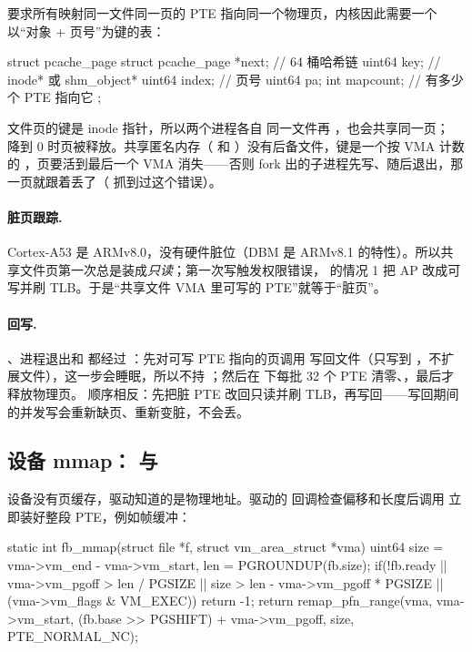  要求所有映射同一文件同一页的 PTE 指向同一个物理页，内核因此需要一个以“对象 $+$ 页号”为键的表：

\begin{ccode}
struct pcache_page {
  struct pcache_page *next;   // 64 桶哈希链
  uint64 key;                 // inode* 或 shm_object*
  uint64 index;               // 页号
  uint64 pa;
  int mapcount;               // 有多少个 PTE 指向它
};
\end{ccode}

文件页的键是 inode 指针，所以两个进程各自  同一文件再 ，也会共享同一页； 降到 0 时页被释放。共享匿名内存（ 和 ）没有后备文件，键是一个按 VMA 计数的 ，页要活到最后一个 VMA 消失——否则 fork 出的子进程先写、随后退出，那一页就跟着丢了（ 抓到过这个错误）。

\paragraph{脏页跟踪.} Cortex-A53 是 ARMv8.0，没有硬件脏位（DBM 是 ARMv8.1 的特性）。所以共享文件页第一次总是装成\emph{只读}；第一次写触发权限错误， 的情况 1 把 AP 改成可写并刷 TLB。于是“共享文件 VMA 里可写的 PTE”就等于“脏页”。

\paragraph{回写.} 、进程退出和  都经过 ：先对可写 PTE 指向的页调用  写回文件（只写到 ，不扩展文件），这一步会睡眠，所以不持 ；然后在  下每批 32 个 PTE 清零、，最后才释放物理页。 顺序相反：先把脏 PTE 改回只读并刷 TLB，再写回——写回期间的并发写会重新缺页、重新变脏，不会丢。

\subsection{设备 mmap： 与 }

设备没有页缓存，驱动知道的是物理地址。驱动的  回调检查偏移和长度后调用  立即装好整段 PTE，例如帧缓冲：

\begin{ccode}
static int fb_mmap(struct file *f, struct vm_area_struct *vma) {
  uint64 size = vma->vm_end - vma->vm_start, len = PGROUNDUP(fb.size);
  if(!fb.ready || vma->vm_pgoff > len / PGSIZE ||
     size > len - vma->vm_pgoff * PGSIZE || (vma->vm_flags & VM_EXEC))
    return -1;
  return remap_pfn_range(vma, vma->vm_start,
                         (fb.base >> PGSHIFT) + vma->vm_pgoff, size, PTE_NORMAL_NC);
}
\end{ccode}

